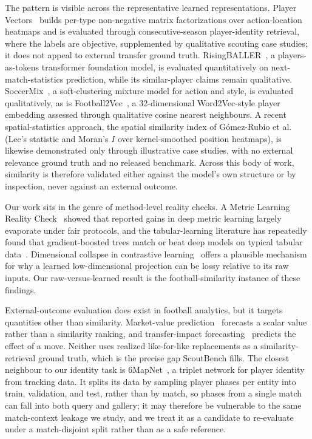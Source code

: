 The pattern is visible across the representative learned representations.
Player Vectors~\cite{decroos2019playervectors} builds per-type non-negative
matrix factorizations over action-location heatmaps and is evaluated through
consecutive-season player-identity retrieval, where the labels are objective,
supplemented by qualitative scouting case studies; it does not appeal to
external transfer ground truth. RisingBALLER~\cite{adjileye2024risingballer},
a players-as-tokens transformer foundation model, is evaluated quantitatively
on next-match-statistics prediction, while its similar-player claims remain
qualitative. SoccerMix~\cite{decroos2020soccermix}, a soft-clustering mixture
model for action and style, is evaluated qualitatively, as is
Football2Vec~\cite{magdaci2021football2vec}, a 32-dimensional Word2Vec-style
player embedding assessed through qualitative cosine nearest neighbours. A
recent spatial-statistics approach, the spatial similarity index of
G\'omez-Rubio et al.~\cite{gomezrubio2024spatial} (Lee's statistic and Moran's
$I$ over kernel-smoothed position heatmaps), is likewise demonstrated only
through illustrative case studies, with no external relevance ground truth and
no released benchmark.
Across this body of work, similarity is therefore validated either against the
model's own structure or by inspection, never against an external outcome.

Our work sits in the genre of method-level reality checks. A Metric Learning
Reality Check~\cite{musgrave2020realitycheck} showed that reported gains in
deep metric learning largely evaporate under fair protocols, and the
tabular-learning literature has repeatedly found that gradient-boosted trees
match or beat deep models on typical tabular
data~\cite{shwartzziv2022tabular,grinsztajn2022whytrees}. Dimensional collapse
in contrastive learning~\cite{jing2022dimensionalcollapse} offers a plausible
mechanism for why a learned low-dimensional projection can be lossy relative
to its raw inputs. Our raw-versus-learned result is the football-similarity
instance of these findings.

External-outcome evaluation does exist in football analytics, but it targets
quantities other than similarity. Market-value
prediction~\cite{marketvalue2023} forecasts a scalar value rather than a
similarity ranking, and transfer-impact
forecasting~\cite{dinsdale2022transferportal} predicts the effect of a move.
Neither uses realized like-for-like replacements as a similarity-retrieval
ground truth, which is the precise gap ScoutBench fills. The closest neighbour
to our identity task is 6MapNet~\cite{kim2021sixmapnet}, a triplet network for
player identity from tracking data. It splits its data by sampling player
phases per entity into train, validation, and test, rather than by match, so
phases from a single match can fall into both query and gallery; it may
therefore be vulnerable to the same match-context leakage we study, and we
treat it as a candidate to re-evaluate under a match-disjoint split rather than
as a safe reference.

